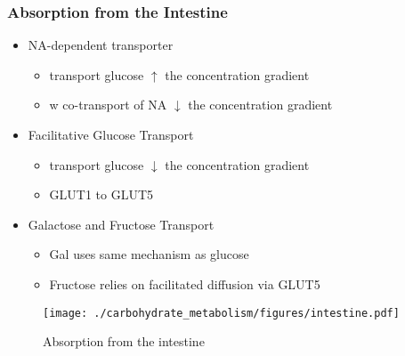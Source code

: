 \documentclass{scrartcl}
\begin{document}
\subsubsection{Absorption from the Intestine}
\label{sec:org2cd4ce1}
\begin{itemize}
\item NA-dependent transporter
\begin{itemize}
\item transport glucose \(\uparrow\) the concentration gradient
\item w co-transport of NA \(\downarrow\) the concentration gradient
\end{itemize}
\item Facilitative Glucose Transport
\begin{itemize}
\item transport glucose \(\downarrow\) the concentration gradient
\item GLUT1 to GLUT5
\end{itemize}
\item Galactose and Fructose Transport
\begin{itemize}
\item Gal uses same mechanism as glucose
\item Fructose relies on facilitated diffusion via GLUT5
\end{itemize}
\end{itemize}

\begin{figure}[htbp]
\centering
\texttt{[image: ./carbohydrate\_metabolism/figures/intestine.pdf]}
\caption{\label{fig:org3fdd471}
Absorption from the intestine}
\end{figure}
\end{document}
